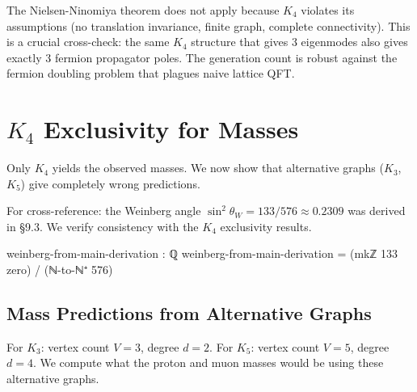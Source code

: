 \documentclass[11pt,a4paper]{book}
\begin{document}
The Nielsen-Ninomiya theorem does not apply because $K_4$ violates its assumptions (no translation invariance, finite graph, complete connectivity). This is a crucial cross-check: the same $K_4$ structure that gives 3 eigenmodes also gives exactly 3 fermion propagator poles. The generation count is robust against the fermion doubling problem that plagues naive lattice QFT.

\chapter{\texorpdfstring{$K_4$}{K4} Exclusivity for Masses}
\label{chap:K4-exclusivity-masses}

Only $K_4$ yields the observed masses. We now show that alternative graphs ($K_3$, $K_5$) give completely wrong predictions.

For cross-reference: the Weinberg angle $\sin^2\theta_W = 133/576 \approx 0.2309$ was derived in \S9.3. We verify consistency with the $K_4$ exclusivity results.

\begin{code}
weinberg-from-main-derivation : ℚ
weinberg-from-main-derivation = (mkℤ 133 zero) / (ℕ-to-ℕ⁺ 576)
\end{code}

\section{Mass Predictions from Alternative Graphs}

For $K_3$: vertex count $V = 3$, degree $d = 2$. For $K_5$: vertex count $V = 5$, degree $d = 4$. We compute what the proton and muon masses would be using these alternative graphs.
\end{document}
